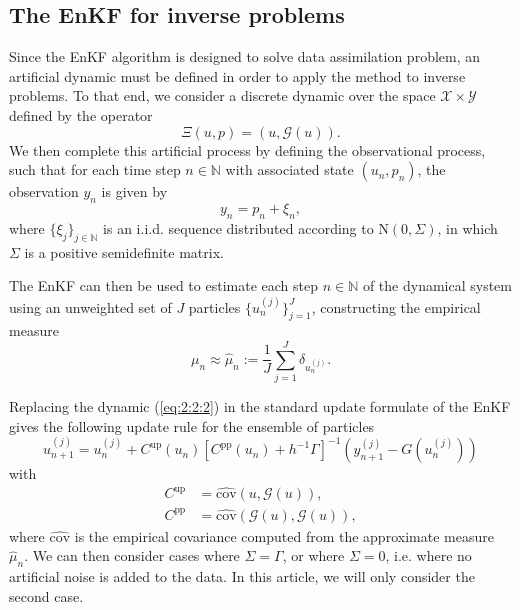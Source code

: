 \documentclass[a4paper,5p]{elsarticle}
\begin{document}
\subsection{The EnKF for inverse problems} \label{subsec:2:2}
Since the EnKF algorithm is designed to solve data assimilation problem, an artificial dynamic must be
defined in order to apply the method to inverse problems. To that end, we consider a discrete dynamic
over the space $\mathcal{X} \times \mathcal{Y}$ defined by the operator
\begin{equation} \label{eq:2:2:1}
    \Xi(u, p) = (u, \mathcal{G}(u)).
\end{equation}
We then complete this artificial process by defining the observational process, such that for each
time step $n \in \mathbb{N}$ with associated state $(u_n, p_n)$, the observation $y_n$ is given by
\begin{equation} \label{eq:2:2:2}
    y_n = p_n + \xi_n,
\end{equation}
where $\{\xi_j\}_{j\in \mathbb{N}}$ is an i.i.d. sequence distributed according to $\text{N}(0, \Sigma)$,
in which $\Sigma$ is a positive semidefinite matrix.

The EnKF can then be used to estimate each step $n \in \mathbb{N}$ of the dynamical system using an
unweighted set of $J$ particles $\{u_n^{(j)}\}_{j = 1}^J$, constructing the empirical measure
\begin{equation} \label{eq:2:2:3}
    \mu_n \approx \hat{\mu}_n := \frac1J\sum_{j=1}^J \delta_{u_n^{(j)}}.
\end{equation}

Replacing the dynamic (\ref{eq:2:2:2}) in the standard update formulate of the EnKF gives the
following update rule for the ensemble of particles
\begin{equation} \label{eq:2:2:4}
    u_{n+1}^{(j)} = u_{n}^{(j)} + C^{\text{up}}(u_n)[C^{\text{pp}}(u_n) + h^{-1}\Gamma]^{-1}(y_{n+1}^{(j)} - G(u_n^{(j)}))
\end{equation}
with 
\begin{equation}
    \begin{aligned}
        C^{\text{up}} &= \hat{\text{cov}}(u, \mathcal{G}(u)),\\
        C^{\text{pp}} &= \hat{\text{cov}}(\mathcal{G}(u), \mathcal{G}(u)),
    \end{aligned}
\end{equation}
where $\hat{\text{cov}}$ is the empirical covariance computed from the approximate measure $\hat{\mu}_n$.
We can then consider cases where $\Sigma = \Gamma$, or where $\Sigma = 0$, i.e. where no artificial noise
is added to the data. In this article, we will only consider the second case.
\end{document}

